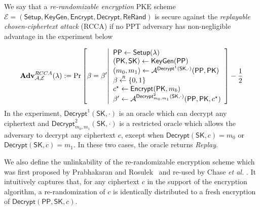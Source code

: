 \documentclass[10pt]{llncs}
\newcommand{\Adv}{\mathbf{Adv}}
\newcommand{\A}{\mathcal{A}}
\newcommand{\SK}{\mathsf{SK}}
\newcommand{\PK}{\mathsf{PK}}
\newcommand{\sample}{\stackrel{{\scriptscriptstyle \mkern4mu R}}{\gets}}
\newcommand{\Setup}{{\mathsf{Setup}}}
\newcommand{\KeyGen}{{\mathsf{KeyGen}}}
\newcommand{\Enc}{{\mathsf{Encrypt}}}
\newcommand{\Dec}{{\mathsf{Decrypt}}}
\newcommand{\Rerand}{{\mathsf{ReRand}}}
\newcommand{\PPP}{\mathsf{PP}}
\begin{document}
  \begin{definition} \label{def:RCCA}
    We say that a \emph{re-randomizable encryption} PKE scheme $\mathcal{E} = (\Setup, \KeyGen, \Enc, \Dec, \Rerand)$ is secure against the \emph{replayable chosen-ciphertext attack} (RCCA) if no PPT adversary has non-negligible advantage in the experiment below
    
    \begin{align*}
      \Adv_{\A, \mathcal{E}}^{RCCA} (\lambda) := \Pr \left[
      \beta = \beta'
      \middle|
      \begin{array}{l}
        \PPP \gets \Setup(\lambda)\\
        (\PK, \SK) \gets \KeyGen(\PPP)\\
        (m_0, m_1) \gets \A^{\Dec^1(\SK, \cdot)}(\PPP, \PK)\\
        \beta \sample \{0,1\}\\
        c^\star \gets \Enc(\PK, m_b )\\
        \beta ' \gets \A^{\Dec^2_{m_0, m_1}(\SK, \cdot)}(\PPP, \PK, c^\star)
      \end{array}
      \right] - \frac{1}{2}
    \end{align*}
      In the experiment, $\Dec^1(\SK, \cdot)$ is an oracle which can decrypt any ciphertext and $\Dec^2_{m_0, m_1}(\SK, \cdot)$ is a restricted oracle which allows the adversary to decrypt any ciphertext $c$, except when $\Dec(\SK, c) = m_0$ or $\Dec(\SK, c) = m_1$. In these two cases, the oracle returns \emph{Replay}.
  \end{definition}
  
  We also define the unlinkability of the re-randomizable encryption scheme which was first proposed by Prabhakaran and Rosulek~\cite{DBLP:conf/crypto/PrabhakaranR07} and re-used by Chase {\it et al.} \cite{DBLP:conf/eurocrypt/ChaseKLM12}. It intuitively captures that, for any ciphertext 
	$c$ in the support of the encryption algorithm, a re-randomization of $c$ is identically distributed to a fresh encryption of $\Dec(\PPP,\SK,c)$.
	
\end{document}
